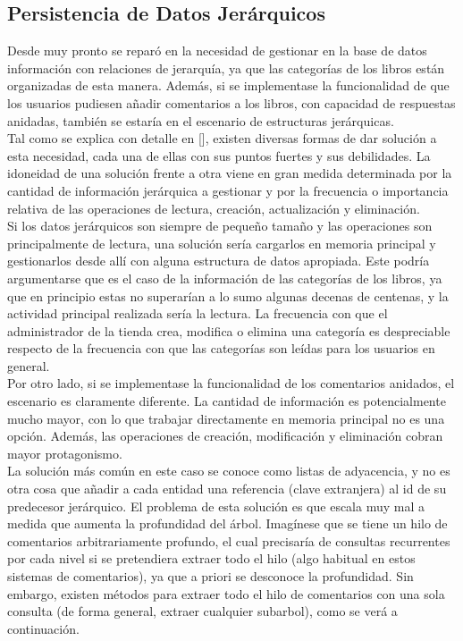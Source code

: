 \documentclass[a4paper]{report}
\begin{document}
    \subsection{Persistencia de Datos Jerárquicos}
    Desde muy pronto se reparó en la necesidad de gestionar en la base de datos información con relaciones de jerarquía, ya que las categorías de los libros están organizadas de esta manera. Además, si se implementase la funcionalidad de que los usuarios pudiesen añadir comentarios a los libros, con capacidad de respuestas anidadas, también se estaría en el escenario de estructuras jerárquicas.
    \\
    
    Tal como se explica con detalle en [], existen diversas formas de dar solución a esta necesidad, cada una de ellas con sus puntos fuertes y sus debilidades. La idoneidad de una solución frente a otra viene en gran medida determinada por la cantidad de información jerárquica a gestionar y por la frecuencia o importancia relativa de las operaciones de lectura, creación, actualización y eliminación.
    \\
    
    Si los datos jerárquicos son siempre de pequeño tamaño y las operaciones son principalmente de lectura, una solución sería cargarlos en memoria principal y gestionarlos desde allí con alguna estructura de datos apropiada. Este podría argumentarse que es el caso de la información de las categorías de los libros, ya que en principio estas no superarían a lo sumo algunas decenas de centenas, y la actividad principal realizada sería la lectura. La frecuencia con que el administrador de la tienda crea, modifica o elimina una categoría es despreciable respecto de la frecuencia con que las categorías son leídas para los usuarios en general.
    \\
    
    Por otro lado, si se implementase la funcionalidad de los comentarios anidados, el escenario es claramente diferente. La cantidad de información es potencialmente mucho mayor, con lo que trabajar directamente en memoria principal no es una opción. Además, las operaciones de creación, modificación y eliminación cobran mayor protagonismo.
    \\
    
    La solución más común en este caso se conoce como listas de adyacencia, y no es otra cosa que añadir a cada entidad una referencia (clave extranjera) al id de su predecesor jerárquico. El problema de esta solución es que escala muy mal a medida que aumenta la profundidad del árbol. Imagínese que se tiene un hilo de comentarios arbitrariamente profundo, el cual precisaría de consultas recurrentes por cada nivel si se pretendiera extraer todo el hilo (algo habitual en estos sistemas de comentarios), ya que a priori se desconoce la profundidad. Sin embargo, existen métodos para extraer todo el hilo de comentarios con una sola consulta (de forma general, extraer cualquier subarbol), como se verá a continuación.
    \\
    
\end{document}
